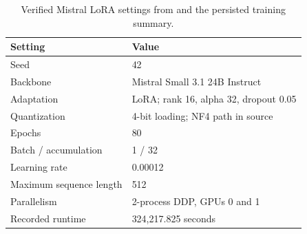 \begin{table}[H]
\centering
\caption{Verified Mistral LoRA settings from  and the persisted training summary.}
\label{tab:training-config}
\begin{tabular}{ll}
\toprule
Setting & Value \\
\midrule
Seed & 42 \\
Backbone & Mistral Small 3.1 24B Instruct \\
Adaptation & LoRA; rank 16, alpha 32, dropout 0.05 \\
Quantization & 4-bit loading; NF4 path in source \\
Epochs & 80 \\
Batch / accumulation & 1 / 32 \\
Learning rate & 0.00012 \\
Maximum sequence length & 512 \\
Parallelism & 2-process DDP, GPUs 0 and 1 \\
Recorded runtime & 324,217.825 seconds \\
\bottomrule
\end{tabular}
\end{table}
